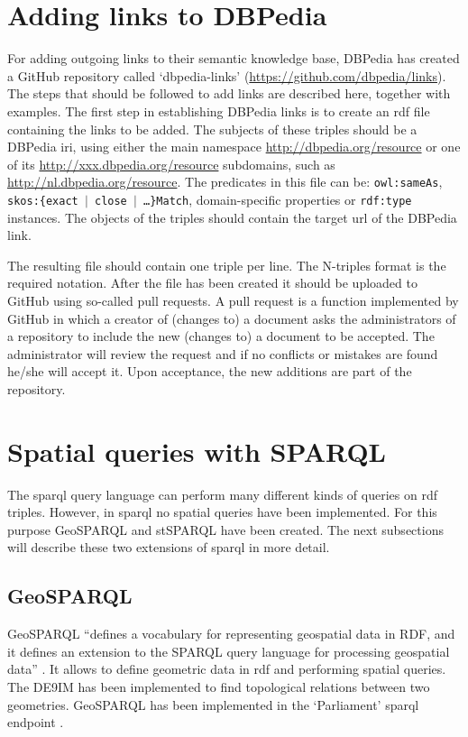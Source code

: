 \section{Adding links to DBPedia}
\label{par:dbpedia}

\begin{sloppypar}
	For adding outgoing links to their semantic knowledge base, DBPedia has created a GitHub repository called `dbpedia-links' (\url{https://github.com/dbpedia/links}). The steps that should be followed to add links are described here, together with examples. The first step in establishing DBPedia links is to create an \ac{rdf} file containing the links to be added. The subjects of these triples should be a DBPedia \ac{iri}, using either the main namespace \url{http://dbpedia.org/resource} or one of its \url{ http://xxx.dbpedia.org/resource} subdomains, such as \url{http://nl.dbpedia.org/resource}. The predicates in this file can be: \texttt{owl:sameAs}, \texttt{skos:\{exact $\vert$ close $\vert$ \ldots \}Match}, domain-specific properties or \texttt{rdf:type} instances. The objects of the triples should contain the target \ac{url} of the DBPedia link. 
\end{sloppypar}

The resulting file should contain one triple per line. The N-triples format is the required notation. After the file has been created it should be uploaded to GitHub using so-called pull requests. A pull request is a function implemented by GitHub in which a creator of (changes to) a document asks the administrators of a repository to include the new (changes to) a document to be accepted. The administrator will review the request and if no conflicts or mistakes are found he/she will accept it. Upon acceptance, the new additions are part of the repository.   

\section{Spatial queries with SPARQL}
\label{par:SpatialFilters}

The \ac{sparql} query language can perform many different kinds of queries on \ac{rdf} triples. However, in \ac{sparql} no spatial queries have been implemented. For this purpose GeoSPARQL and stSPARQL have been created. The next subsections will describe these two extensions of \ac{sparql} in more detail.

\subsection{GeoSPARQL}
GeoSPARQL \enquote{defines a vocabulary for representing geospatial data in RDF, and it defines an extension to the SPARQL query language for processing geospatial data} \cite[p. xvi]{LD:OGC}. It allows to define geometric data in \ac{rdf} and performing spatial queries. The \ac{DE9IM} \citep{GIS:9IM} has been implemented to find topological relations between two geometries. GeoSPARQL has been implemented in the `Parliament' \ac{sparql} endpoint \citep{LD:GeoSPARQL}. 

